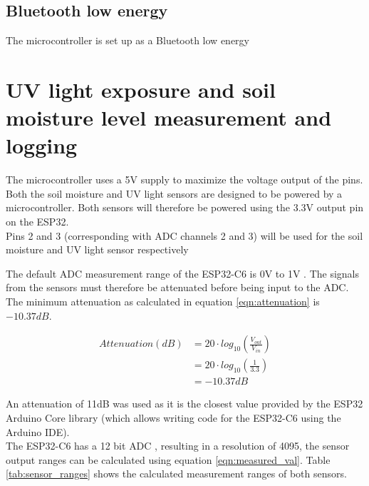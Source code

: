 \subsection{Bluetooth low energy}
The microcontroller is set up as a Bluetooth low energy 

\section{\Ac{UV} light exposure and soil moisture level measurement and logging}

The microcontroller uses a 5V supply to maximize the voltage output of the pins.
\\


Both the soil moisture and UV light sensors are designed to be powered by a microcontroller. Both sensors will therefore be powered using the 3.3V output pin on the ESP32. 
\\
Pins 2 and 3 (corresponding with \ac{ADC} channels 2 and 3) will be used for the soil moisture and UV light sensor respectively

The default \ac{ADC} measurement range of the ESP32-C6 is 0V to 1V \cite{esp_datasheet} \cite{esp_github}. The signals from the sensors must therefore be attenuated before being input to the \ac{ADC}. The minimum attenuation as calculated in equation \ref{eqn:attenuation} \cite{attenuation_formula} is \(-10.37 dB\).

\begin{equation}
\label{eqn:attenuation}
\begin{split}
    Attenuation  (dB) & = 20 \cdot log_{10}\left ( \frac{V_{out}}{V_{in}} \right ) \\ 
    & = 20 \cdot log_{10}\left ( \frac{1}{3.3} \right ) \\ 
    & = -10.37 dB
\end{split}
\end{equation}

An attenuation of 11dB was used as it is the closest value provided by the ESP32 Arduino Core library \cite{esp_arduino_github} (which allows writing code for the ESP32-C6 using the Arduino IDE). 
\\
The ESP32-C6 has a 12 bit \ac{ADC} \cite{esp_tech_ref}, resulting in a resolution of 4095, the sensor output ranges can be calculated using equation \ref{eqn:measured_val}. Table \ref{tab:sensor_ranges} shows the calculated measurement ranges of both sensors.

